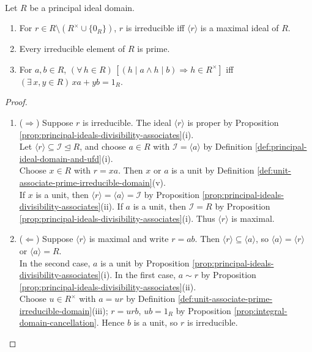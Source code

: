 \begin{theorem} \label{thm:pid-prime-irreducible-bezout} \\
Let $R$ be a principal ideal domain.
\begin{enumerate}[label=(\roman*)]
\setlength{\itemsep}{0pt}
\item For $r\in R\setminus(R^\times\cup\{0_R\})$, $r$ is irreducible iff $\langle r\rangle$ is a maximal ideal of $R$.
\item Every irreducible element of $R$ is prime.
\item For $a,b\in R$, $(\forall\,h\in R)\,[(h\mid a\land h\mid b)\Rightarrow h\in R^\times]$ iff $(\exists\,x,y\in R)\,xa+yb=1_R$.
\end{enumerate}
\begin{proof}
\begin{enumerate}[label=(\roman*)]
\setlength{\itemsep}{0pt}
\item[$(i)$] ($\Rightarrow$) Suppose $r$ is irreducible. The ideal $\langle r\rangle$ is proper by Proposition \ref{prop:principal-ideals-divisibility-associates}(i).\\
Let $\langle r\rangle\subseteq\mathcal{I}\trianglelefteq R$, and choose $a\in R$ with $\mathcal{I}=\langle a\rangle$ by Definition \ref{def:principal-ideal-domain-and-ufd}(i).\\
Choose $x\in R$ with $r=xa$. Then $x$ or $a$ is a unit by Definition \ref{def:unit-associate-prime-irreducible-domain}(v).\\
If $x$ is a unit, then $\langle r\rangle=\langle a\rangle=\mathcal{I}$ by Proposition \ref{prop:principal-ideals-divisibility-associates}(ii). If $a$ is a unit, then $\mathcal{I}=R$ by Proposition \ref{prop:principal-ideals-divisibility-associates}(i). Thus $\langle r\rangle$ is maximal.
\item[$(i)$] ($\Leftarrow$) Suppose $\langle r\rangle$ is maximal and write $r=ab$. Then $\langle r\rangle\subseteq\langle a\rangle$, so $\langle a\rangle=\langle r\rangle$ or $\langle a\rangle=R$.\\
In the second case, $a$ is a unit by Proposition \ref{prop:principal-ideals-divisibility-associates}(i). In the first case, $a\sim r$ by Proposition \ref{prop:principal-ideals-divisibility-associates}(ii).\\
Choose $u\in R^\times$ with $a=ur$ by Definition \ref{def:unit-associate-prime-irreducible-domain}(iii); $r=urb$, $ub=1_R$ by Proposition \ref{prop:integral-domain-cancellation}. Hence $b$ is a unit, so $r$ is irreducible.

\end{enumerate}
\end{proof}
\end{theorem}
